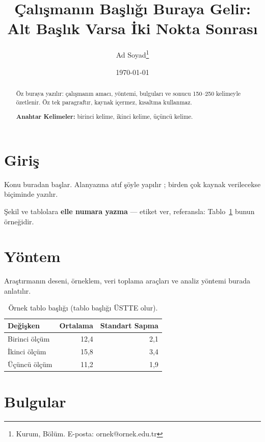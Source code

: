 \documentclass[12pt,a4paper]{article}
\title{\bfseries Çalışmanın Başlığı Buraya Gelir:\\ Alt Başlık Varsa İki Nokta Sonrası}
\author{Ad Soyad\thanks{Kurum, Bölüm. E-posta: ornek@ornek.edu.tr}}
\date{\today}
\begin{document}
\maketitle

\begin{abstract}
\noindent Öz buraya yazılır: çalışmanın amacı, yöntemi, bulguları ve sonucu 150--250
kelimeyle özetlenir. Öz tek paragraftır, kaynak içermez, kısaltma kullanmaz.

\vspace{0.5em}
\noindent\textbf{Anahtar Kelimeler:} birinci kelime, ikinci kelime, üçüncü kelime.
\end{abstract}

\section{Giriş}

Konu buradan başlar. Alanyazına atıf şöyle yapılır \cite{yilmaz2024}; birden çok
kaynak verilecekse \cite{yilmaz2024,ozturk2023} biçiminde yazılır.

Şekil ve tablolara \textbf{elle numara yazma} --- etiket ver, referansla:
Tablo~\ref{tbl:ornek} bunun örneğidir.

\section{Yöntem}

Araştırmanın deseni, örneklem, veri toplama araçları ve analiz yöntemi burada anlatılır.

\begin{table}[htbp]
  \centering
  \caption{Örnek tablo başlığı (tablo başlığı ÜSTTE olur).}
  \label{tbl:ornek}
  \begin{tabular}{lrr}
    \toprule
    Değişken & Ortalama & Standart Sapma \\
    \midrule
    Birinci ölçüm  & 12,4 & 2,1 \\
    İkinci ölçüm   & 15,8 & 3,4 \\
    Üçüncü ölçüm   & 11,2 & 1,9 \\
    \bottomrule
  \end{tabular}
\end{table}

\section{Bulgular}
\end{document}
